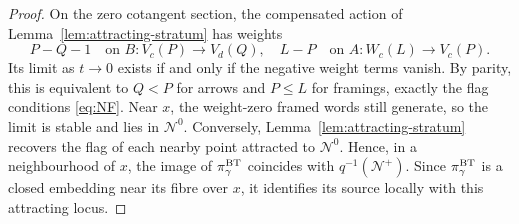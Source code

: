 \documentclass[11pt,reqno]{amsart}
\theoremstyle{definition}
\theoremstyle{remark}
\begin{document}
\begin{proof}
On the zero cotangent section, the compensated action of
Lemma~\ref{lem:attracting-stratum} has weights
\[
 P-Q-1\quad\text{on }B:V_c(P)\to V_d(Q),\quad
 L-P\quad\text{on }A:W_c(L)\to V_c(P).
\]
Its limit as $t\to0$ exists if and only if the negative weight terms
vanish. By parity, this is equivalent to $Q<P$ for arrows and
$P\leqslant L$ for framings, exactly the flag conditions \eqref{eq:NF}.
Near $x$, the weight-zero framed words still generate, so the limit
is stable and lies in $\mathcal N^0$. Conversely,
Lemma~\ref{lem:attracting-stratum} recovers the flag of each nearby
point attracted to $\mathcal N^0$. 
Hence, in a neighbourhood of \(x\), the image of \(\pi_\gamma^{\rm BT}\) 
coincides with \(q^{-1}(\mathcal N^+)\). 
Since \(\pi_\gamma^{\rm BT}\) is a closed embedding near its fibre over \(x\), 
it identifies its source locally with this attracting locus.


\end{proof}
\end{document}
